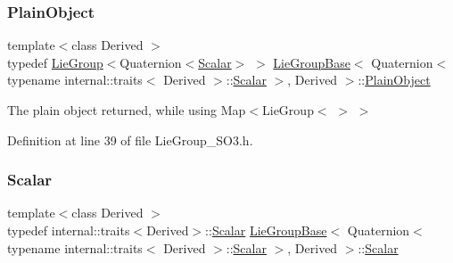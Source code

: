 \subsubsection{\texorpdfstring{Plain\+Object}{PlainObject}}
{\footnotesize\ttfamily template$<$class Derived $>$ \\
typedef \hyperlink{class_lie_group}{Lie\+Group}$<$Quaternion$<$\hyperlink{class_lie_group_base_3_01_quaternion_3_01typename_01internal_1_1traits_3_01_derived_01_4_1_1_scalar_01_4_00_01_derived_01_4_afadeceb3b98e52deecc572e71efb82a8}{Scalar}$>$ $>$ \hyperlink{class_lie_group_base}{Lie\+Group\+Base}$<$ Quaternion$<$ typename internal\+::traits$<$ Derived $>$\+::\hyperlink{class_lie_group_base_3_01_quaternion_3_01typename_01internal_1_1traits_3_01_derived_01_4_1_1_scalar_01_4_00_01_derived_01_4_afadeceb3b98e52deecc572e71efb82a8}{Scalar} $>$, Derived $>$\+::\hyperlink{class_lie_group_base_3_01_quaternion_3_01typename_01internal_1_1traits_3_01_derived_01_4_1_1_scalar_01_4_00_01_derived_01_4_aadda973938291d3ccd25e606c6333a27}{Plain\+Object}}

The plain object returned, while using Map$<$Lie\+Group$<$ $>$ $>$ 

Definition at line 39 of file Lie\+Group\+\_\+\+S\+O3.\+h.

\hypertarget{class_lie_group_base_3_01_quaternion_3_01typename_01internal_1_1traits_3_01_derived_01_4_1_1_scalar_01_4_00_01_derived_01_4_afadeceb3b98e52deecc572e71efb82a8}{}\label{class_lie_group_base_3_01_quaternion_3_01typename_01internal_1_1traits_3_01_derived_01_4_1_1_scalar_01_4_00_01_derived_01_4_afadeceb3b98e52deecc572e71efb82a8} 
\subsubsection{\texorpdfstring{Scalar}{Scalar}}
{\footnotesize\ttfamily template$<$class Derived $>$ \\
typedef internal\+::traits$<$Derived$>$\+::\hyperlink{class_lie_group_base_3_01_quaternion_3_01typename_01internal_1_1traits_3_01_derived_01_4_1_1_scalar_01_4_00_01_derived_01_4_afadeceb3b98e52deecc572e71efb82a8}{Scalar} \hyperlink{class_lie_group_base}{Lie\+Group\+Base}$<$ Quaternion$<$ typename internal\+::traits$<$ Derived $>$\+::\hyperlink{class_lie_group_base_3_01_quaternion_3_01typename_01internal_1_1traits_3_01_derived_01_4_1_1_scalar_01_4_00_01_derived_01_4_afadeceb3b98e52deecc572e71efb82a8}{Scalar} $>$, Derived $>$\+::\hyperlink{class_lie_group_base_3_01_quaternion_3_01typename_01internal_1_1traits_3_01_derived_01_4_1_1_scalar_01_4_00_01_derived_01_4_afadeceb3b98e52deecc572e71efb82a8}{Scalar}}

